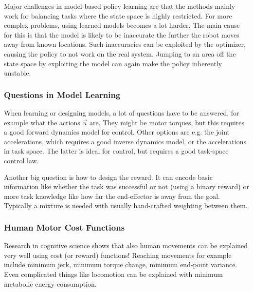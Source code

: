 			Major challenges in model-based policy learning are that the methods mainly work for balancing tasks where the state space is highly restricted. For more complex problems, using learned models becomes a lot harder. The main cause for this is that the model is likely to be inaccurate the further the robot moves away from known locations. Such inaccuracies can be exploited by the optimizer, causing the policy to not work on the real system. Jumping to an area off the state space by exploiting the model can again make the policy inherently unstable.

			\subsubsection{Questions in Model Learning}
				When learning or designing models, a lot of questions have to be answered, for example what the actions \(\vec{u}\) are. They might be motor torques, but this requires a good forward dynamics model for control. Other options are e.g. the joint accelerations, which requires a good inverse dynamics model, or the accelerations in task space. The latter is ideal for control, but requires a good task-space control law.

				Another big question is how to design the reward. It can encode basic information like whether the task was successful or not (using a binary reward) or more task knowledge like how far the end-effector is away from the goal. Typically a mixture is needed with usually hand-crafted weighting between them.

			\subsubsection{Human Motor Cost Functions}
				Research in cognitive science shows that also human movements can be explained very well using cost (or reward) functions! Reaching movements for example include minimum jerk, minimum torque change, minimum end-point variance. Even complicated things like locomotion can be explained with minimum metabolic energy consumption.


